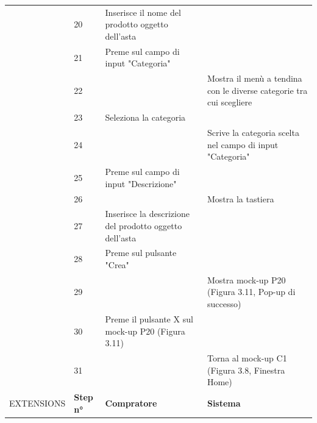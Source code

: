 \begin{longtable}{|C{3.0cm}|C{1.3cm}|L{5.2cm}|L{5.2cm}|}
                        & 20
                        & Inserisce il nome del prodotto oggetto dell'asta
                        & \\
                        & 21
                        & Preme sul campo di input "Categoria"
                        & \\
                        & 22
                        &
                        & Mostra il menù a tendina con le diverse categorie tra cui scegliere \\
                        & 23
                        & Seleziona la categoria
                        & \\
                        & 24
                        & 
                        & Scrive la categoria scelta nel campo di input "Categoria"\\
                        & 25
                        & Preme sul campo di input "Descrizione"
                        & \\
                        & 26
                        &
                        & Mostra la tastiera \\
                        & 27
                        & Inserisce la descrizione del prodotto oggetto dell'asta
                        & \\
                        & 28
                        & Preme sul pulsante "Crea"
                        & \\
                        & 29
                        & 
                        & Mostra mock-up P20 (Figura 3.11, Pop-up di successo)\\
                        & 30
                        & Preme il pulsante X sul mock-up P20 (Figura 3.11)
                        & \\
                        & 31
                        & 
                        & Torna al mock-up C1 (Figura 3.8, Finestra Home)\\
                \hline
                    EXTENSIONS
                    & \textbf{Step n°} 
                    & \textbf{Compratore} 
                    & \textbf{Sistema}\\

\end{longtable}
